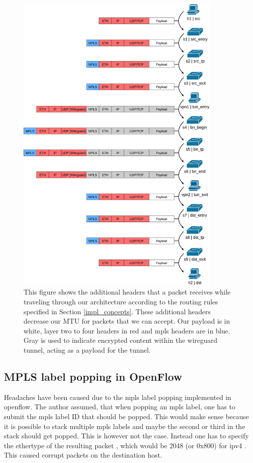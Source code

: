 \begin{figure}[hp]
    \centering
    \includegraphics[width=10cm]{images/chapter_6/packet_structure.png}
    \caption[Additional headers of packets]{This figure shows the additional headers that a packet receives while traveling through our architecture according to the routing rules specified in Section \ref{impl_concepts}. These additional headers decrease our MTU for packets that we can accept. Our payload is in white, layer two to four headers in red and \acrshort{mpls} headers are in blue. Gray is used to indicate encrypted content within the \gls{wireguard} tunnel, acting as a payload for the tunnel.}
    \label{fig:packet_structure}
\end{figure}

\subsection{MPLS label popping in OpenFlow}
Headaches have been caused due to the \acrshort{mpls} label popping implemented in \Gls{openflow}. The author assumed, that when popping an \acrshort{mpls} label, one has to submit the \acrshort{mpls} label ID that should be popped. This would make sense because it is possible to stack multiple \acrshort{mpls} labels and maybe the second or third in the stack should get popped. This is however not the case. Instead one has to specify the \gls{ethertype} of the resulting packet \cite{openflow}, which would be 2048 (or 0x800) for \acrshort{ipv4} \cite{rfc7042}. This caused corrupt packets on the destination host.

